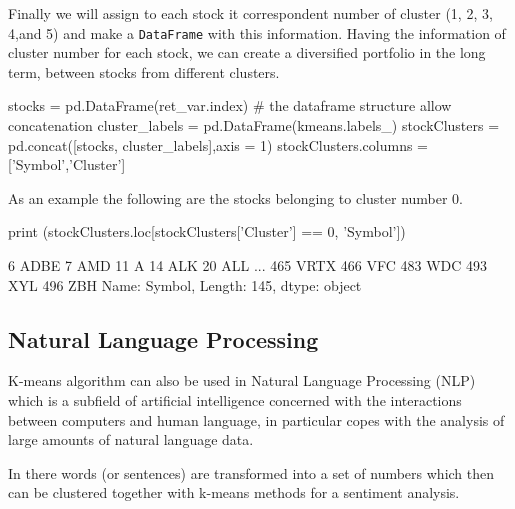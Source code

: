 Finally we will assign to each stock it correspondent number of cluster (1, 2, 3, 4,and 5) and make a \texttt{DataFrame} with this information. Having the information of cluster number for each stock, we can create a diversified portfolio in the long term, between stocks from different clusters.

\begin{ipython} 
stocks = pd.DataFrame(ret_var.index) # the dataframe structure allow concatenation
cluster_labels = pd.DataFrame(kmeans.labels_)
stockClusters = pd.concat([stocks, cluster_labels],axis = 1)
stockClusters.columns = ['Symbol','Cluster']
\end{ipython}
 
As an example the following are the stocks belonging to cluster number 0.

\begin{ipython} 
print (stockClusters.loc[stockClusters['Cluster'] == 0, 'Symbol'])
\end{ipython}
\begin{ioutput}
6      ADBE
7       AMD
11        A
14      ALK
20      ALL
       ... 
465    VRTX
466     VFC
483     WDC
493     XYL
496     ZBH
Name: Symbol, Length: 145, dtype: object
\end{ioutput}

\subsection{Natural Language Processing}

K-means algorithm can also be used in Natural Language Processing (NLP)~\cite{bib:nlp} which is a subfield of artificial intelligence concerned with the interactions between computers and human language, in particular copes with the analysis of large amounts of natural language data.

In there words (or sentences) are transformed into a set of numbers which then can be clustered together with k-means methods for a sentiment analysis.
 
